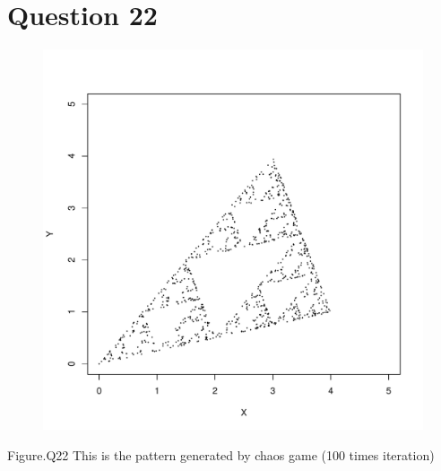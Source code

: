 \documentclass[12pt,a4paper]{article}
\begin{document}
\section{Question 22}
\begin{figure}[h]
\centering
\includegraphics[width=\textwidth]{Q22Plot.pdf}
\end{figure}
Figure.Q22 This is the pattern generated by chaos game (100 times iteration)

\newpage
\end{document}
